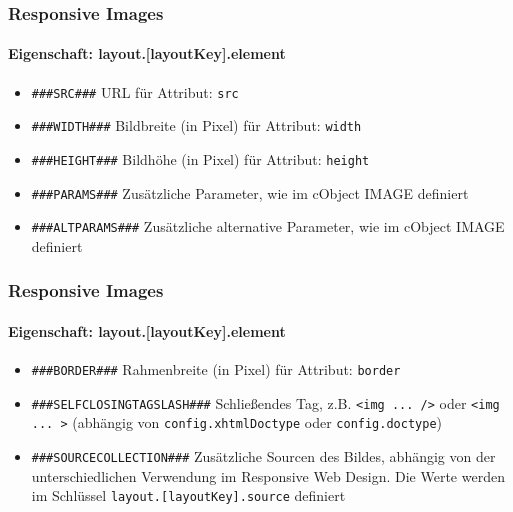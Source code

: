 
\begin{frame}[fragile]
	\frametitle{Responsive Images}
	\framesubtitle{Eigenschaft: layout.[layoutKey].element}

	\begin{itemize}
		\item \lstinline!###SRC###!\newline
			URL für Attribut: \texttt{src}

		\item \lstinline!###WIDTH###!\newline
			Bildbreite (in Pixel) für Attribut: \texttt{width}

		\item \lstinline!###HEIGHT###!\newline
			Bildhöhe (in Pixel) für Attribut: \texttt{height}

		\item \lstinline!###PARAMS###!\newline
			Zusätzliche Parameter, wie im cObject IMAGE definiert

		\item \lstinline!###ALTPARAMS###!\newline
			Zusätzliche alternative Parameter, wie im cObject IMAGE definiert

	\end{itemize}

\end{frame}


\begin{frame}[fragile]
	\frametitle{Responsive Images}
	\framesubtitle{Eigenschaft: layout.[layoutKey].element}

	\begin{itemize}
		\item \lstinline!###BORDER###!\newline
			Rahmenbreite (in Pixel) für Attribut: \texttt{border}

		\item \lstinline!###SELFCLOSINGTAGSLASH###!\newline
			Schließendes Tag, z.B. \texttt{<img ... />} oder \texttt{<img ... >}\newline
			(abhängig von \texttt{config.xhtmlDoctype} oder \texttt{config.doctype})

		\item \lstinline!###SOURCECOLLECTION###!\newline
			Zusätzliche Sourcen des Bildes, abhängig von der unterschiedlichen Verwendung im Responsive Web Design.\newline
			Die Werte werden im Schlüssel \texttt{layout.[layoutKey].source} definiert
	\end{itemize}

\end{frame}

